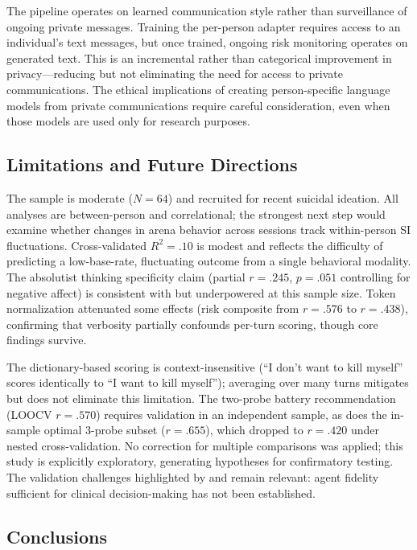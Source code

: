 \documentclass[review,12pt,authoryear]{elsarticle}
\begin{document}
The pipeline operates on learned communication style rather than surveillance of ongoing private messages. Training the per-person adapter requires access to an individual's text messages, but once trained, ongoing risk monitoring operates on generated text. This is an incremental rather than categorical improvement in privacy---reducing but not eliminating the need for access to private communications. The ethical implications of creating person-specific language models from private communications require careful consideration, even when those models are used only for research purposes.

\subsection{Limitations and Future Directions}

The sample is moderate ($N = 64$) and recruited for recent suicidal ideation. All analyses are between-person and correlational; the strongest next step would examine whether changes in arena behavior across sessions track within-person SI fluctuations. Cross-validated $R^2 = .10$ is modest and reflects the difficulty of predicting a low-base-rate, fluctuating outcome from a single behavioral modality. The absolutist thinking specificity claim (partial $r = .245$, $p = .051$ controlling for negative affect) is consistent with \citet{almosaiwi2018absolute} but underpowered at this sample size. Token normalization attenuated some effects (risk composite from $r = .576$ to $r = .438$), confirming that verbosity partially confounds per-turn scoring, though core findings survive.

The dictionary-based scoring is context-insensitive (``I don't want to kill myself'' scores identically to ``I want to kill myself''); averaging over many turns mitigates but does not eliminate this limitation. The two-probe battery recommendation (LOOCV $r = .570$) requires validation in an independent sample, as does the in-sample optimal 3-probe subset ($r = .655$), which dropped to $r = .420$ under nested cross-validation. No correction for multiple comparisons was applied; this study is explicitly exploratory, generating hypotheses for confirmatory testing. The validation challenges highlighted by \citet{tornberg2025validation} and \citet{tornberg2025validation} remain relevant: agent fidelity sufficient for clinical decision-making has not been established.

\subsection{Conclusions}
\end{document}

